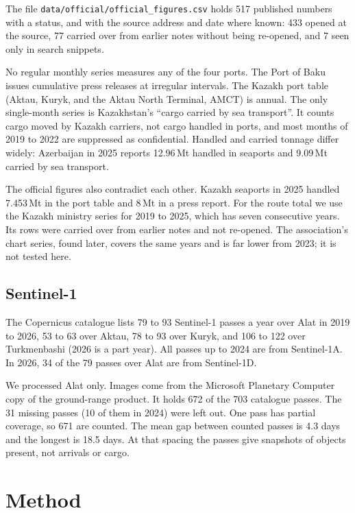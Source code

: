 \documentclass[11pt,a4paper]{article}
\newcommand{\Mt}{\,Mt}
\begin{document}
The file \texttt{data/official/official\_figures.csv} holds 517 published numbers with a status, and with the source address and date where known: 433 opened at the source, 77 carried over from earlier notes without being re-opened, and 7 seen only in search snippets.

No regular monthly series measures any of the four ports. The Port of Baku issues cumulative press releases at irregular intervals. The Kazakh port table (Aktau, Kuryk, and the Aktau North Terminal, AMCT) is annual. The only single-month series is Kazakhstan's ``cargo carried by sea transport''. It counts cargo moved by Kazakh carriers, not cargo handled in ports, and most months of 2019 to 2022 are suppressed as confidential. Handled and carried tonnage differ widely: Azerbaijan in 2025 reports 12.96\Mt{} handled in seaports and 9.09\Mt{} carried by sea transport.

The official figures also contradict each other. Kazakh seaports in 2025 handled 7.453\Mt{} in the port table and 8\Mt{} in a press report. For the route total we use the Kazakh ministry series for 2019 to 2025, which has seven consecutive years. Its rows were carried over from earlier notes and not re-opened. The association's chart series, found later, covers the same years and is far lower from 2023; it is not tested here.

\subsection{Sentinel-1}

The Copernicus catalogue lists 79 to 93 Sentinel-1 passes a year over Alat in 2019 to 2026, 53 to 63 over Aktau, 78 to 93 over Kuryk, and 106 to 122 over Turkmenbashi (2026 is a part year). All passes up to 2024 are from Sentinel-1A. In 2026, 34 of the 79 passes over Alat are from Sentinel-1D.

We processed Alat only. Images come from the Microsoft Planetary Computer copy of the ground-range product. It holds 672 of the 703 catalogue passes. The 31 missing passes (10 of them in 2024) were left out. One pass has partial coverage, so 671 are counted. The mean gap between counted passes is 4.3 days and the longest is 18.5 days. At that spacing the passes give snapshots of objects present, not arrivals or cargo.

\section{Method}
\label{sec:method}
\end{document}
